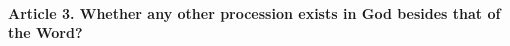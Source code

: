 \documentclass{ucetd}
\begin{document}
\paragraph{Article 3. Whether any other procession exists in God besides that of the Word?}
\end{document}
